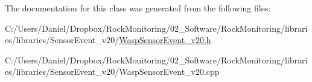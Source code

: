The documentation for this class was generated from the following files\+:\begin{DoxyCompactItemize}
\item 
C\+:/\+Users/\+Daniel/\+Dropbox/\+Rock\+Monitoring/02\+\_\+\+Software/\+Rock\+Monitoring/libraries/libraries/\+Sensor\+Event\+\_\+v20/\hyperlink{_wasp_sensor_event__v20_8h}{Wasp\+Sensor\+Event\+\_\+v20.\+h}\item 
C\+:/\+Users/\+Daniel/\+Dropbox/\+Rock\+Monitoring/02\+\_\+\+Software/\+Rock\+Monitoring/libraries/libraries/\+Sensor\+Event\+\_\+v20/Wasp\+Sensor\+Event\+\_\+v20.\+cpp\end{DoxyCompactItemize}
